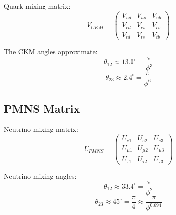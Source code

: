 \begin{definition}
\label{def:ckm}
Quark mixing matrix:
\begin{equation}
V_{CKM} = \begin{pmatrix}
V_{ud} & V_{us} & V_{ub} \\
V_{cd} & V_{cs} & V_{cb} \\
V_{td} & V_{ts} & V_{tb}
\end{pmatrix}
\end{equation}
\end{definition}

\begin{proposition}
\label{prop:ckm-golden}
The CKM angles approximate:
\begin{equation}
\theta_{12} \approx 13.0^\circ = \frac{\pi}{\phi^3}
\end{equation}
\begin{equation}
\theta_{23} \approx 2.4^\circ = \frac{\pi}{\phi^6}
\end{equation}
\end{proposition}

\subsection{PMNS Matrix}

\begin{definition}
\label{def:pmns}
Neutrino mixing matrix:
\begin{equation}
U_{PMNS} = \begin{pmatrix}
U_{e1} & U_{e2} & U_{e3} \\
U_{\mu1} & U_{\mu2} & U_{\mu3} \\
U_{\tau1} & U_{\tau2} & U_{\tau3}
\end{pmatrix}
\end{equation}
\end{definition}

\begin{proposition}
\label{prop:pmns-golden}
Neutrino mixing angles:
\begin{equation}
\theta_{12} \approx 33.4^\circ = \frac{\pi}{\phi^2}
\end{equation}
\begin{equation}
\theta_{23} \approx 45^\circ = \frac{\pi}{4} \approx \frac{\pi}{\phi^{0.694}}
\end{equation}
\end{proposition}

